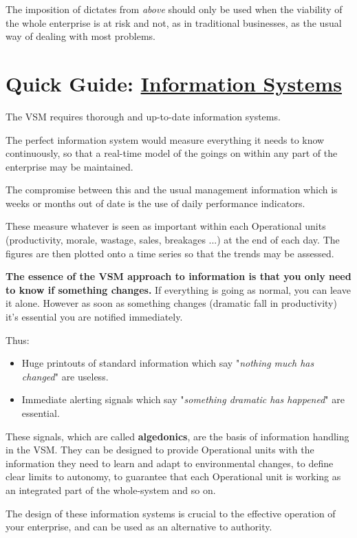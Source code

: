 The imposition of dictates from \textit{above} should only be used when the viability of the whole enterprise is at risk and not, as in traditional businesses, as the usual way of dealing with most problems.

\section*{Quick Guide: \href{https://vsmg.lrc.org.uk/6infsys.html}{Information Systems}}
The VSM requires thorough and up-to-date information systems.

The perfect information system would measure everything it needs to know continuously, so that a real-time model of the goings on within any part of the enterprise may be maintained.

The compromise between this and the usual management information which is weeks or months out of date is the use of daily performance indicators.

These measure whatever is seen as important within each Operational units (productivity, morale, wastage, sales, breakages ...) at the end of each day. The figures are then plotted onto a time series so that the trends may be assessed.

\textbf{The essence of the VSM approach to information is that you only need to know if something changes.} If everything is going as normal, you can leave it alone. However as soon as something changes (dramatic fall in productivity) it's essential you are notified immediately.

Thus:

\begin{itemize}
  \item Huge printouts of standard information which say "\textit{nothing much has changed}" are useless.

  \item Immediate alerting signals which say "\textit{something dramatic has happened}" are essential.

\end{itemize}

These signals, which are called \textbf{algedonics}, are the basis of information handling in the VSM. They can be designed to provide Operational units with the information they need to learn and adapt to environmental changes, to define clear limits to autonomy, to guarantee that each Operational unit is working as an integrated part of the whole-system and so on.

The design of these information systems is crucial to the effective operation of your enterprise, and can be used as an alternative to authority.

